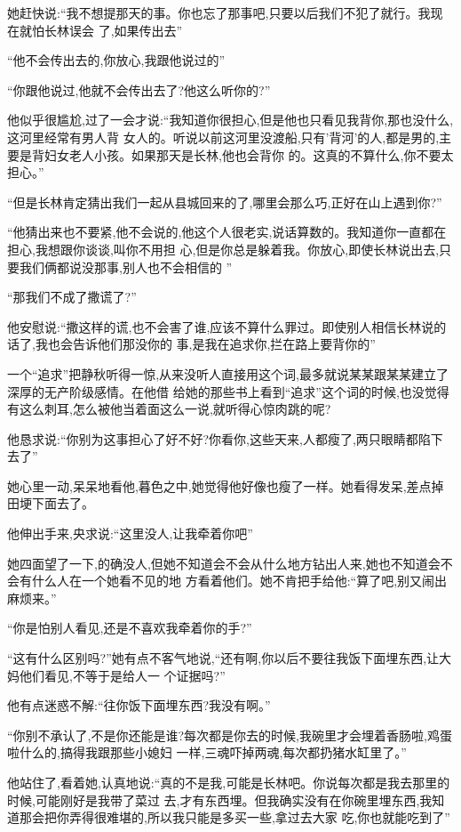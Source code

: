 ﻿\documentclass[12pt]{article}
\begin{document}
她赶快说:``我不想提那天的事。你也忘了那事吧,只要以后我们不犯了\myrule 就行。我现在就怕长林\myrule 误会
了,如果传出去\myrule ''

``他不会传出去的,你放心,我跟他说过的\myrule ''

``你跟他说过,他就不会传出去了?他这么听你的?''

他似乎很尴尬,过了一会才说:``我知道你很担心,但是\myrule 他也只看见我背你,那也没什么,这河里经常有男人背
女人的。听说以前这河里没渡船,只有'背河'的人,都是男的,主要是背妇女老人小孩。如果那天是长林,他也会背你
的。这真的不算什么,你不要太担心。''

``但是长林肯定猜出我们一起从县城回来的了,哪里会那么巧,正好在山上遇到你?''

``他猜出来也不要紧,他不会说的,他这个人很老实,说话算数的。我知道你一直都在担心,我想跟你谈谈,叫你不用担
心,但是你\myrule 总是躲着我。你放心,即使长林说出去,只要我们俩都说没那事,别人也不会\myrule 相信的
\myrule ''

``那我们不成了撒谎了?''

他安慰说:``撒这样的谎,也不会害了谁,应该不算什么罪过。即使别人相信长林说的话了,我也会告诉他们那没你的
事,是我在追求你,拦在路上要背你的\myrule ''

一个``追求''把静秋听得一惊,从来没听人直接用这个词,最多就说某某跟某某建立了深厚的无产阶级感情。在他借
给她的那些书上看到``追求''这个词的时候,也没觉得有这么刺耳,怎么被他当着面这么一说,就听得心惊肉跳的呢?

他恳求说:``你别为这事担心了好不好?你看你,这些天来,人都瘦了\myrule ,两只眼睛都陷下去了\myrule ''

她心里一动,呆呆地看他,暮色之中,她觉得他好像也瘦了一样。她看得发呆,差点掉田埂下面去了。

他伸出手来,央求说:``这里没人,让我牵着你吧\myrule ''

她四面望了一下,的确没人,但她不知道会不会从什么地方钻出人来,她也不知道会不会有什么人在一个她看不见的地
方看着他们。她不肯把手给他:``算了吧,别又闹出麻烦来。''

``你是怕别人看见,还是\myrule 不喜欢我牵着你的手?''

``这有什么区别吗?''她有点不客气地说,``还有啊,你以后不要往我饭下面埋东西,让大妈他们看见,不等于是给人一
个证据吗?''

他有点迷惑不解:``往你饭下面埋东西?我没有啊。''

``你别不承认了,不是你还能是谁?每次都是你去的时候,我碗里才会埋着香肠啦,鸡蛋啦什么的,搞得我跟那些小媳妇
一样,三魂吓掉两魂,每次都扔猪水缸里了。''

他站住了,看着她,认真地说:``真的不是我,可能是长林吧。你说每次都是我去那里的时候,可能刚好是我带了菜过
去,才有东西埋。但我确实没有在你碗里埋东西,我知道那会把你弄得很难堪的,所以我只能是多买一些,拿过去大家
吃,你也就能吃到了\myrule ''
\end{document}
